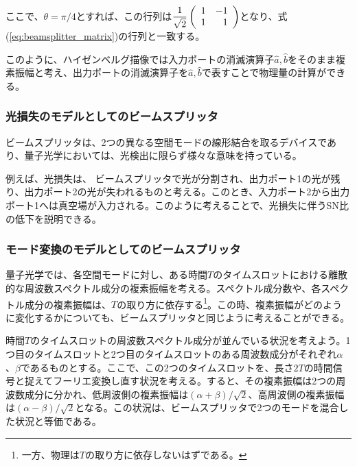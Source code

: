 ここで、$\theta = \pi/4$とすれば、この行列は$\displaystyle \frac{1}{\sqrt{2}}\left(\begin{array}{r r} 1 & -1\\1 & 1\end{array}\right)$となり、式(\ref{eq:beamsplitter_matrix})の行列と一致する。

このように、ハイゼンベルグ描像では入力ポートの消滅演算子$\hat a, \hat b$をそのまま複素振幅と考え、出力ポートの消滅演算子を$\hat a, \hat b$で表すことで物理量の計算ができる。

\subsubsection{光損失のモデルとしてのビームスプリッタ}
ビームスプリッタは、2つの異なる空間モードの線形結合を取るデバイスであり、量子光学においては、光検出に限らず様々な意味を持っている。

例えば、光損失は、
ビームスプリッタで光が分割され、出力ポート1の光が残り、出力ポート2の光が失われるものと考える。このとき、入力ポート2から出力ポート1へは真空場が入力される。このように考えることで、光損失に伴うSN比の低下を説明できる。

\subsubsection{モード変換のモデルとしてのビームスプリッタ}
量子光学では、各空間モードに対し、ある時間$T$のタイムスロットにおける離散的な周波数スペクトル成分の複素振幅を考える。スペクトル成分数や、各スペクトル成分の複素振幅は、$T$の取り方に依存する\footnote{一方、物理は$T$の取り方に依存しないはずである。}。この時、複素振幅がどのように変化するかについても、ビームスプリッタと同じように考えることができる。

時間$T$のタイムスロットの周波数スペクトル成分が並んでいる状況を考えよう。1つ目のタイムスロットと2つ目のタイムスロットのある周波数成分がそれぞれ$\alpha$、$\beta$であるものとする。ここで、この2つのタイムスロットを、長さ$2T$の時間信号と捉えてフーリエ変換し直す状況を考える。すると、その複素振幅は2つの周波数成分に分かれ、低周波側の複素振幅は$(\alpha + \beta) / \sqrt 2$、高周波側の複素振幅は$(\alpha - \beta) / \sqrt 2$となる。この状況は、ビームスプリッタで2つのモードを混合した状況と等価である。
